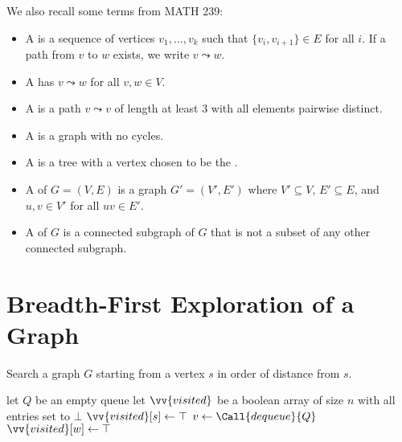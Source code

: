 \begin{defn*}
  We also recall some terms from MATH 239:
  \begin{itemize}[nosep]
    \item A  is a sequence of vertices $v_1,\dotsc,v_k$
          such that $\{v_i,v_{i+1}\} \in E$ for all $i$.
          If a path from $v$ to $w$ exists, we write $v \leadsto w$.
    \item A  has $v \leadsto w$ for all $v,w \in V$.
    \item A  is a path $v \leadsto v$ of length at least 3
          with all elements pairwise distinct.
    \item A  is a graph with no cycles.
    \item A  is a tree with a vertex chosen to be the .
    \item A  of $G = (V,E)$ is a graph $G' = (V',E')$
          where $V' \subseteq V$, $E' \subseteq E$, and $u,v \in V'$ for all $uv \in E'$.
    \item A  of $G$ is a connected subgraph of $G$
          that is not a subset of any other connected subgraph.
  \end{itemize}
\end{defn*}

\section{Breadth-First Exploration of a Graph}

\begin{problem}
  Search a graph $G$ starting from a vertex $s$
  in order of distance from $s$.
\end{problem}

\begin{algorithm}
  \caption{}
  \begin{algorithmic}[1]
    \State let $Q$ be an empty queue
    \State let $\vv{visited}$ be a boolean array of size $n$ with all entries set to $\bot$
    \State {}
    \State $\vv{visited}[s] \gets \top$
    \State $v \gets \Call{dequeue}{Q}$
     \label{line:bfs:forloop}
    \State {}
    \State $\vv{visited}[w] \gets \top$
    \EndIf
    \EndFor
    \EndWhile
  \end{algorithmic}
\end{algorithm}

